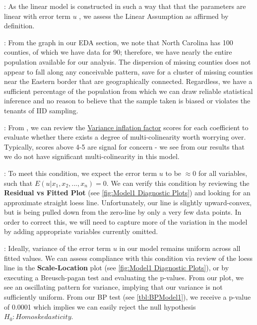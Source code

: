 \begin{description}[font=$\bullet$~\normalfont\scshape\small\color{red!50!black}]
	\small
	\item [CLM 1 - Linear in parameters] {\fontsize{10}{10} \selectfont : As the linear model is constructed in such a way that that the parameters are linear with error term $u$ , we assess the Linear Assumption as affirmed by definition.}
	\item [CLM 2 - Random sampling] {\fontsize{10}{10} \selectfont : From the  graph in our EDA section, we note that North Carolina has 100 counties, of which we have data for 90; therefore, we have nearly the entire population available for our analysis.  The dispersion of missing counties does not appear to fall along any conceivable pattern, save for a cluster of missing counties near the Eastern border that are geographically connected.  Regardless, we have a sufficient percentage of the population from which we can draw reliable statistical inference and no reason to believe that the sample taken is biased or violates the tenants of IID sampling.}
	\item [CLM 3 - No perfect multi-colinearity] {\fontsize{10}{10} \selectfont : From , we can review the \href{https://en.wikipedia.org/wiki/Variance_inflation_factor}{Variance inflation factor} scores for each coefficient to evaluate whether there exists a degree of multi-colinearity worth worrying over.  Typically, scores above 4-5 are signal for concern - we see from our results that we do not have significant multi-colinearity in this model.}
	\item [CLM 4 - Zero-conditional mean] {\fontsize{10}{10} \selectfont : To meet this condition, we expect the error term $u$ to be $\approx 0$ for all variables, such that $E(u|x_1,x_2,...,x_n) = 0$.  We can verify this condition by reviewing the \textbf{Residual vs Fitted Plot} (see \ref{fig:Model1 Diagnostic Plots}) and looking for an approximate straight loess line.  Unfortunately, our line is slightly upward-convex, but is being pulled down from the zero-line by only a very few data points.  In order to correct this, we will need to capture more of the variation in the model by adding appropriate variables currently omitted.}
	\item [CLM 5 - Homoskedasticity] {\fontsize{10}{10} \selectfont : Ideally, variance of the error term $u$ in our model remains uniform across all fitted values.  We can assess compliance with this condition via review of the loess line in the \textbf{Scale-Location} plot (see \ref{fig:Model1 Diagnostic Plots}), or by executing a Breusch-pagan test and evaluating the p-values.  From our plot, we see an oscillating pattern for variance, implying that our variance is not sufficiently uniform.  From our BP test (see \ref{tbl:BPModel1}), we receive a p-value of 0.0001 which implies we can easily reject the null hypothesis $H_0 : Homoskedasticity$.}

\end{description}
